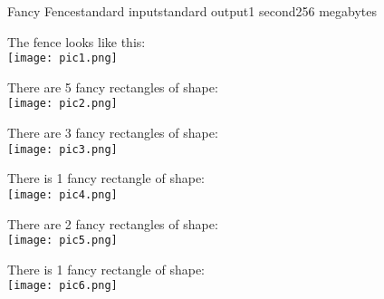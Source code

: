 \begin{problem}{Fancy Fence}{standard input}{standard output}{1 second}{256 megabytes}
\begin{center}
\end{center}


\Example

\begin{example}
%
\end{example}

\Note
The fence looks like this:\\
\texttt{[image: pic1.png]}

There are 5 fancy rectangles of shape:\\
\texttt{[image: pic2.png]}

There are 3 fancy rectangles of shape:\\
\texttt{[image: pic3.png]}

There is 1 fancy rectangle of shape:\\
\texttt{[image: pic4.png]}

There are 2 fancy rectangles of shape:\\
\texttt{[image: pic5.png]}

There is 1 fancy rectangle of shape:\\
\texttt{[image: pic6.png]}

\end{problem}

